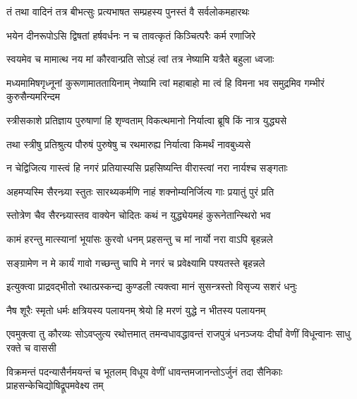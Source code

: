 
\twolineshloka
{तं तथा वादिनं तत्र बीभत्सुः प्रत्यभाषत}
{सम्प्रहस्य पुनस्तं वै सर्वलोकमहारथः}


\twolineshloka
{भयेन दीनरूपोऽसि द्विषतां हर्षवर्धनः}
{न च तावत्कृतं किञ्चित्परैः कर्म रणाजिरे}


\twolineshloka
{स्वयमेव च मामात्थ नय मां कौरवान्प्रति}
{सोऽहं त्वां तत्र नेष्यामि यत्रैते बहुला ध्वजाः}


\threelineshloka
{मध्यमामिषगृध्नूनां कुरूणामाततायिनाम्}
{नेष्यामि त्वां महाबाहो मा त्वं हि विमना भव}
{समुद्रमिव गम्भीरं कुरुसैन्यमरिन्दम}


\twolineshloka
{स्त्रीसकाशे प्रतिज्ञाय पुरुषाणां हि शृण्वताम्}
{विकत्थमानो निर्यात्वा ब्रूषि किं नात्र युद्ध्यसे}


\twolineshloka
{तथा स्त्रीषु प्रतिश्रुत्य पौरुषं पुरुषेषु च}
{रथमारुह्य निर्यात्वा किमर्थं नावबुध्यसे}


\twolineshloka
{न चेद्विजित्य गास्त्वं हि नगरं प्रतियास्यसि}
{प्रहसिष्यन्ति वीरास्त्वां नरा नार्यश्च सङ्गताः}


\twolineshloka
{अहमप्यस्मि सैरन्ध्र्या स्तुतः सारथ्यकर्मणि}
{नाहं शक्नोम्यनिर्जित्य गाः प्रयातुं पुरं प्रति}


\twolineshloka
{स्तोत्रेण चैव सैरन्ध्र्यास्तव वाक्येन चोदितः}
{कथं न युद्ध्येयमहं कुरूनेतान्स्थिरो भव}




\twolineshloka
{कामं हरन्तु मात्स्यानां भूयांसः कुरवो धनम्}
{प्रहसन्तु च मां नार्यो नरा वाऽपि बृहन्नले}


\twolineshloka
{सङ्ग्रामेण न मे कार्यं गावो गच्छन्तु चापि मे}
{नगरं च प्रवेक्ष्यामि पश्यतस्ते बृहन्नले}



\twolineshloka
{इत्युक्त्वा प्राद्रवद्भीतो रथात्प्रस्कन्द्य कुण्डली}
{त्यक्त्वा मानं सुसन्त्रस्तो विसृज्य सशरं धनुः}




\twolineshloka
{नैष शूरैः स्मृतो धर्मः क्षत्रियस्य पलायनम्}
{श्रेयो हि मरणं युद्धे न भीतस्य पलायनम्}



\threelineshloka
{एवमुक्त्वा तु कौरव्यः सोऽवप्लुत्य रथोत्तमात्}
{तमन्वधावद्धावन्तं राजपुत्रं धनञ्जयः}
{दीर्घां वेणीं विधून्वानः साधु रक्ते च वाससी}


\threelineshloka
{विक्रमन्तं पदन्यासैर्नमयन्तं च भूतलम्}
{विधूय वेणीं धावन्तमजानन्तोऽर्जुनं तदा}
{सैनिकाः प्राहसन्केचिद्योषिद्रूपमवेक्ष्य तम्}


